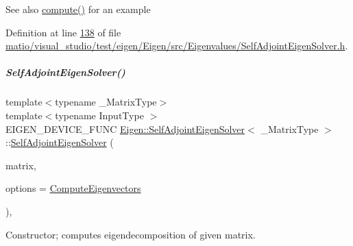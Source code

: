 \begin{DoxySeeAlso}{See also}
\hyperlink{group___eigenvalues___module_a88bcdc24112efa7c4d2ebb3476efcbe9}{compute()} for an example 
\end{DoxySeeAlso}


Definition at line \hyperlink{matio_2visual__studio_2test_2eigen_2_eigen_2src_2_eigenvalues_2_self_adjoint_eigen_solver_8h_source_l00138}{138} of file \hyperlink{matio_2visual__studio_2test_2eigen_2_eigen_2src_2_eigenvalues_2_self_adjoint_eigen_solver_8h_source}{matio/visual\+\_\+studio/test/eigen/\+Eigen/src/\+Eigenvalues/\+Self\+Adjoint\+Eigen\+Solver.\+h}.

\mbox{\label{group___eigenvalues___module_ade694ed7b0a4d9da9480cedc849be76f}} 
\subparagraph{\texorpdfstring{Self\+Adjoint\+Eigen\+Solver()}{SelfAdjointEigenSolver()}\hspace{0.1cm}{\footnotesize\ttfamily [6/6]}}
{\footnotesize\ttfamily template$<$typename \+\_\+\+Matrix\+Type$>$ \\
template$<$typename Input\+Type $>$ \\
E\+I\+G\+E\+N\+\_\+\+D\+E\+V\+I\+C\+E\+\_\+\+F\+U\+NC \hyperlink{group___eigenvalues___module_class_eigen_1_1_self_adjoint_eigen_solver}{Eigen\+::\+Self\+Adjoint\+Eigen\+Solver}$<$ \+\_\+\+Matrix\+Type $>$\+::\hyperlink{group___eigenvalues___module_class_eigen_1_1_self_adjoint_eigen_solver}{Self\+Adjoint\+Eigen\+Solver} (\begin{DoxyParamCaption}\item[{const \hyperlink{group___core___module_struct_eigen_1_1_eigen_base}{Eigen\+Base}$<$ Input\+Type $>$ \&}]{matrix,  }\item[{int}]{options = {\ttfamily \hyperlink{group__enums_ggae3e239fb70022eb8747994cf5d68b4a9ada93d8885bde32b876ba4af01d3292cc}{Compute\+Eigenvectors}} }\end{DoxyParamCaption})\hspace{0.3cm}{\ttfamily [inline]}, {\ttfamily [explicit]}}



Constructor; computes eigendecomposition of given matrix. 


